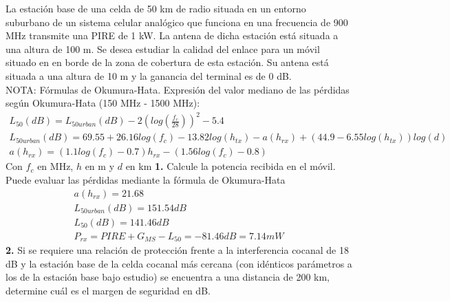 \begin{exercise}[7]
	La estación base de una celda de 50 km de radio situada en un entorno suburbano de un sistema celular analógico que funciona en una frecuencia de 900 MHz transmite una PIRE de 1 kW. La antena de dicha estación está situada a una altura de 100 m. Se desea estudiar la calidad del enlace para un móvil situado en en borde de la zona de cobertura de esta estación. Su antena está situada a una altura de 10 m y la ganancia del terminal es de 0 dB.\\ 
	NOTA: Fórmulas de Okumura-Hata. Expresión del valor mediano de las pérdidas según Okumura-Hata (150 MHz - 1500 MHz):
	\begin{gather*}
		L_{50}(dB)=L_{50urban}(dB)-2(log(\frac{f_c}{28}))^2-5.4\\
		L_{50urban}(dB)=69.55+26.16log(f_c)-13.82log(h_{tx})-a(h_{rx})+(44.9-6.55log(h_{tx}))log(d)\\
		a(h_{rx})=(1.1log(f_c)-0.7)h_{rx}-(1.56log(f_c)-0.8)
	\end{gather*}
	Con $f_c$ en MHz, $h$ en m y $d$ en km
	\textbf{1.} Calcule la potencia recibida en el móvil. Puede evaluar las pérdidas mediante la fórmula de Okumura-Hata\\
	\begin{gather*}
		a(h_{rx})=21.68\\
		L_{50urban}(dB)=151.54dB\\
		L_{50}(dB)=141.46dB\\
		P_{rx}=PIRE+G_{MS}-L_{50}=-81.46dB=7.14mW
	\end{gather*}
	\textbf{2.} Si se requiere una relación de protección frente a la interferencia cocanal de 18 dB y la estación base de la celda cocanal más cercana (con idénticos parámetros a los de la estación base bajo estudio) se encuentra a una distancia de 200 km, determine cuál es el margen de seguridad en dB.
\end{exercise}
